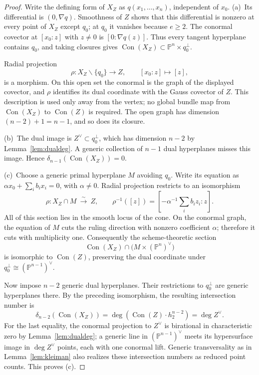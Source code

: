 \documentclass[acmsmall,screen,nonacm]{acmart}
\theoremstyle{definition}
\theoremstyle{remark}
\DeclareMathOperator{\Con}{Con}
\newcommand{\PP}{\mathbb{P}}
\newcommand{\pdeg}{\delta}
\begin{document}
\begin{proof}
Write the defining form of $X_Z$ as $q(x_1,\dots,x_n)$, independent of
$x_0$.  (a)~Its differential is $(0,\nabla q)$.  Smoothness of $Z$ shows
that this differential is nonzero at every point of $X_Z$ except $q_0$;
at $q_0$ it vanishes because $e\ge2$.  The conormal covector at
$[x_0:z]$ with $z\ne0$ is $[0:\nabla q(z)]$.  Thus every tangent
hyperplane contains $q_0$, and taking closures gives
$\Con(X_Z)\subset\PP^n\times q_0^\perp$.

Radial projection
\[
  \rho:X_Z\smallsetminus\{q_0\}\longrightarrow Z,
  \qquad [x_0:z]\longmapsto[z],
\]
is a morphism.  On this open set the conormal is the graph of the displayed
covector, and $\rho$ identifies its dual coordinate with the Gauss covector
of $Z$.  This description is used only away from the vertex; no global
bundle map from $\Con(X_Z)$ to $\Con(Z)$ is required.  The open graph has
dimension $(n-2)+1=n-1$, and so does its closure.

(b)~The dual image is $Z^\vee\subset q_0^\perp$, which has dimension
$n-2$ by Lemma~\ref{lem:dualdeg}.  A generic collection of $n-1$ dual
hyperplanes misses this image.  Hence $\pdeg_{n-1}(\Con(X_Z))=0$.

(c)~Choose a generic primal hyperplane $M$ avoiding $q_0$.  Write its
equation as $\alpha x_0+\sum_i b_i x_i=0$, with $\alpha\ne0$.
Radial projection restricts to an isomorphism
\[
  \rho:X_Z\cap M\ \xrightarrow{\ \sim\ }\ Z,
  \qquad
  \rho^{-1}([z])=
  \left[-\alpha^{-1}\sum_i b_i z_i:z\right].
\]  All of this section
lies in the smooth locus of the cone.  On the conormal graph, the equation
of $M$ cuts the ruling direction with nonzero coefficient $\alpha$;
therefore it cuts with multiplicity one.  Consequently the scheme-theoretic
section
\[
  \Con(X_Z)\cap\bigl(M\times(\PP^n)^\vee\bigr)
\]
is isomorphic to $\Con(Z)$, preserving the dual coordinate under
$q_0^\perp\cong(\PP^{n-1})^\vee$.

Now impose $n-2$ generic dual hyperplanes.  Their restrictions to
$q_0^\perp$ are generic hyperplanes there.  By the preceding isomorphism,
the resulting intersection number is
\[
  \pdeg_{n-2}(\Con(X_Z))
  =\deg\!\left(\Con(Z)\cdot h_2^{n-2}\right)
  =\deg Z^\vee.
\]
For the last equality, the conormal projection to $Z^\vee$ is birational
in characteristic zero by Lemma~\ref{lem:dualdeg}; a generic line in
$(\PP^{n-1})^\vee$ meets its hypersurface image in $\deg Z^\vee$ points,
each with one conormal lift.  Generic transversality as in
Lemma~\ref{lem:kleiman} also realizes these intersection numbers as reduced
point counts.  This proves (c).
\end{proof}
\end{document}
